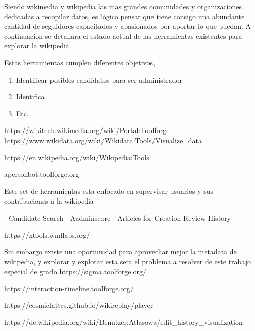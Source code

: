 Siendo wikimedia y wikipedia las mas grandes comunidades y organizaciones dedicadas a recopilar datos, es lógico pensar que tiene consigo una abundante cantidad de seguidores capacitados y apasionados por aportar lo que puedan. A continuacion se detallara el estado actual de las herramientas existentes para explorar la wikipedia.

Estas herramientas cumplen diferentes objetivos, 

\begin{enumerate}
    \item Identificar posibles candidatos para ser administrador
    \item Identifica 
    \item Etc.
  \end{enumerate}


https://wikitech.wikimedia.org/wiki/Portal:Toolforge
https://www.wikidata.org/wiki/Wikidata:Tools/Visualize_data

https://en.wikipedia.org/wiki/Wikipedia:Tools

apersonbot.toolforge.org

Este set de herramientas esta enfocado en supervisar usuarios y sus contribuciones a la wikipedia

- Candidate Search
- Aadminscore
- Articles for Creation Review History

https://xtools.wmflabs.org/


Sin embargo existe una oportunidad para aprovechar mejor la metadata de wikipedia, y explorar y explotar esta sera el problema a resolver de este trabajo especial de grado
https://sigma.toolforge.org/


https://interaction-timeline.toolforge.org/


https://cosmiclattes.github.io/wikireplay/player


https://de.wikipedia.org/wiki/Benutzer:Atlasowa/edit_history_visualization